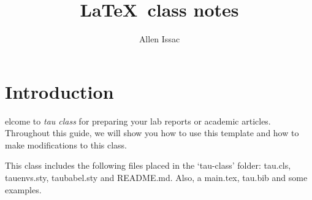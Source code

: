 \documentclass[9pt,a4paper,twoside]{tau-class/tau}
\title{\LaTeX\ class notes}
\author[a,1]{Allen Issac}
\affil[a]{Master of Science Physics}
\begin{document}
		
    \maketitle 
    \thispagestyle{firststyle} \tauabstract 
    \tableofcontents
    \linenumbers 
    

\section{Introduction}

    elcome to \textit{tau class} for preparing your lab reports or academic articles. Throughout this guide, we will show you how to use this template and how to make modifications to this class. 
	
    This class includes the following files placed in the ‘tau-class’ folder: tau.cls, tauenvs.sty, taubabel.sty and README.md. Also, a main.tex, tau.bib and some examples. 

\end{document}
